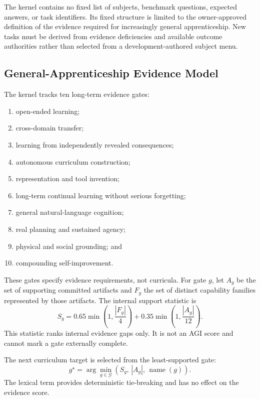 The kernel contains no fixed list of subjects, benchmark questions, expected
answers, or task identifiers.  Its fixed structure is limited to the
owner-approved definition of the evidence required for increasingly general
apprenticeship.  New tasks must be derived from evidence deficiencies and
available outcome authorities rather than selected from a development-authored
subject menu.

\subsection{General-Apprenticeship Evidence Model}
\label{subsec:general-apprentice-evidence-model}

The kernel tracks ten long-term evidence gates:
\begin{enumerate}
    \item open-ended learning;
    \item cross-domain transfer;
    \item learning from independently revealed consequences;
    \item autonomous curriculum construction;
    \item representation and tool invention;
    \item long-term continual learning without serious forgetting;
    \item general natural-language cognition;
    \item real planning and sustained agency;
    \item physical and social grounding; and
    \item compounding self-improvement.
\end{enumerate}
These gates specify evidence requirements, not curricula.  For gate $g$, let
$A_g$ be the set of supporting committed artifacts and $F_g$ the set of
distinct capability families represented by those artifacts.  The internal
support statistic is
\begin{equation}
S_g = 0.65\min\!\left(1,\frac{|F_g|}{4}\right)
      +0.35\min\!\left(1,\frac{|A_g|}{12}\right).
\label{eq:internal-apprentice-support}
\end{equation}
This statistic ranks internal evidence gaps only.  It is not an AGI score and
cannot mark a gate externally complete.

The next curriculum target is selected from the least-supported gate:
\begin{equation}
g^{\star}=\arg\min_{g\in\mathcal{G}}
\left(S_g,\,|A_g|,\,\operatorname{name}(g)\right).
\label{eq:weakest-apprentice-gate}
\end{equation}
The lexical term provides deterministic tie-breaking and has no effect on the
evidence score.

